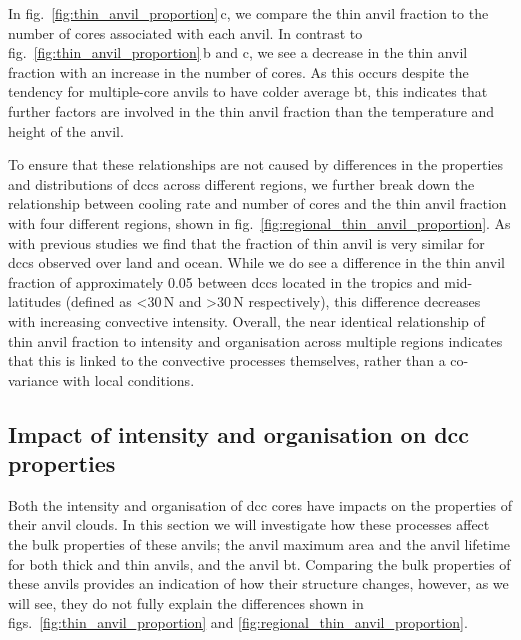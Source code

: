 In fig.~\ref{fig:thin_anvil_proportion}\,c, we compare the thin anvil fraction to the number of cores associated with each anvil.
In contrast to fig.~\ref{fig:thin_anvil_proportion}\,b and c, we see a decrease in the thin anvil fraction with an increase in the number of cores.
As this occurs despite the tendency for multiple-core anvils to have colder average \acrshort{bt}, this indicates that further factors are involved in the thin anvil fraction than the temperature and height of the anvil.

To ensure that these relationships are not caused by differences in the properties and distributions of \acrshort{dcc}s across different regions, we further break down the relationship between cooling rate and number of cores and the thin anvil fraction with four different regions, shown in fig.~\ref{fig:regional_thin_anvil_proportion}.
As with previous studies we find that the fraction of thin anvil is very similar for \acrshort{dcc}s observed over land and ocean.
While we do see a difference in the thin anvil fraction of approximately 0.05 between \acrshort{dcc}s located in the tropics and mid-latitudes (defined as \textless 30\,\textdegree N and \textgreater 30\,\textdegree N respectively), this difference decreases with increasing convective intensity.
Overall, the near identical relationship of thin anvil fraction to intensity and organisation across multiple regions indicates that this is linked to the convective processes themselves, rather than a co-variance with local conditions.

\subsection{Impact of intensity and organisation on \acrshort{dcc} properties}

Both the intensity and organisation of \acrshort{dcc} cores have impacts on the properties of their anvil clouds.
In this section we will investigate how these processes affect the bulk properties of these anvils; the anvil maximum area and the anvil lifetime for both thick and thin anvils, and the anvil \acrshort{bt}.
Comparing the bulk properties of these anvils provides an indication of how their structure changes, however, as we will see, they do not fully explain the differences shown in figs.~\ref{fig:thin_anvil_proportion} and \ref{fig:regional_thin_anvil_proportion}.

